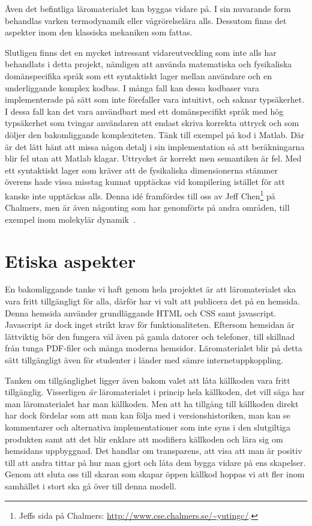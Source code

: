 Även det befintliga läromaterialet kan byggas vidare på. I sin nuvarande
form behandlas varken termodynamik eller vågrörelselära alls. Dessutom
finns det aspekter inom den klassiska mekaniken som fattas.

Slutligen finns det en mycket intressant vidareutveckling som inte alls har
behandlats i detta projekt, nämligen att använda matematiska och fysikaliska domänspecifika språk som
ett syntaktiskt lager mellan användare och en underliggande komplex kodbas. I
många fall kan dessa kodbaser vara implementerade på sätt som inte förefaller vara intuitivt, och saknar
typsäkerhet. I dessa fall kan det vara användbart med ett
domänspecifikt språk med hög typsäkerhet som tvingar användaren att
endast skriva korrekta uttryck och som döljer den bakomliggande komplexiteten. Tänk till exempel på kod i Matlab. Där är det lätt hänt att missa någon detalj i sin implementation så att beräkningarna blir fel utan att Matlab klagar. Uttrycket är korrekt men semantiken är fel. Med ett syntaktiskt lager som kräver att de fysikaliska dimensionerna stämmer överens hade vissa misstag kunnat upptäckas vid kompilering istället för att kanske inte upptäckas alls. Denna idé framfördes till oss av Jeff Chen\footnote{Jeffs sida på Chalmers:
\url{http://www.cse.chalmers.se/\~yutingc/}.}
på Chalmers, men är även någonting som har genomförts på andra områden, till
exempel inom molekylär dynamik~\cite{MD}.

\section{Etiska aspekter}

En bakomliggande tanke vi haft genom hela projektet är att läromaterialet ska
vara fritt tillgängligt för alla, därför har vi valt att publicera det på en
hemsida.  Denna hemsida använder grundläggande HTML och CSS samt javascript.
Javascript är dock inget strikt krav för funktionaliteten. Eftersom hemsidan är
lättviktig bör den fungera väl även på gamla datorer och telefoner, till
skillnad från tunga PDF-filer och många moderna hemsidor. Läromaterialet blir på
detta sätt tillgängligt även för studenter i länder med sämre
internetuppkoppling.

Tanken om tillgänglighet ligger även bakom valet att låta källkoden vara fritt
tillgänglig. Visserligen \textit{är} läromaterialet i princip hela källkoden, det vill säga
har man läromaterialet har man källkoden. Men att ha tillgång till källkoden
direkt har dock fördelar som att man kan följa med i versionshistoriken, man kan
se kommentarer och alternativa implementationer som inte syns i den slutgiltiga
produkten samt att det blir enklare att modifiera källkoden och lära sig om
hemsidans uppbyggnad.  Det handlar om transparens, att visa att man är positiv till att andra
tittar på hur man gjort och låta dem bygga vidare på ens skapelser. Genom att
sluta oss till skaran som skapar öppen källkod hoppas vi att fler inom samhället
i stort ska gå över till denna modell.

